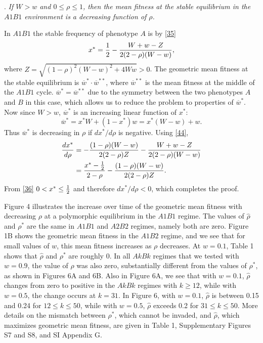 \documentclass[9pt,twocolumn,twoside,lineno]{pnas-new}
\newcommand{\an}[1]{\begin{align}#1\end{align}}
\begin{document}
. {\sl If $W>w$ and $0\le\rho\le 1$, then the mean fitness at the stable equilibrium in the $A1B1$ environment is a decreasing function of $\rho$.}\par
\medskip

 In $A1B1$ the stable frequency of phenotype $A$ is by \eqref{35}
\begin{equation}
x^* ={1\over 2} -{W+w-Z\over 2(2-\rho)(W-w)},
\label{44}\end{equation}
where $Z =\sqrt{(1-\rho)^2(W-w)^2 +4Ww}>0$.
The geometric mean fitness at the stable equilibrium is $\overline w^*\cdot \overline w^{**}$, where $\overline w^{**}$ is the mean fitness at the middle of the $A1B1$ cycle.
$\overline w^* =\overline w^{**}$ due to the symmetry between the two phenotypes $A$ and $B$ in this case, which allows us to reduce the problem to properties of $\overline w^*$.  Now since $W>w$,  $\overline w^*$ is an increasing linear function of $x^*$:
\begin{equation}
\overline w^* =x^*W +(1-x^*)w = x^*(W-w) +w.
\label{45}\end{equation}
Thus $\overline w^*$ is decreasing in $\rho$ if $dx^*/d\rho$ is negative. Using \eqref{44},
\begin{equation}
\an{
{dx^*\over d\rho} &=- {(1-\rho)(W-w)\over 2(2-\rho)Z} -{W+w-Z\over 2(2-\rho)(W-w)}\\
& = {x^*-{1\over 2}\over 2-\rho} -{(1-\rho)(W-w)\over 2(2-\rho)Z}.}
\label{46}\end{equation}
From \eqref{36} $0<x^*\le{1\over 2}$ and therefore $dx^*/d\rho <0$, which completes the proof.

Figure 4 illustrates the increase over time of the geometric mean fitness with decreasing $\rho$ at a polymorphic equilibrium in the $A1B1$ regime.
The values of $\hat\rho$ and $\rho^*$ are the same in $A1B1$ and $A2B2$ regimes, namely both are zero.
Figure 1B shows the geometric mean fitness in the $A1B2$ regime, and we see that for small values of $w$, this mean fitness increases as $\rho$ decreases.
At $w=0.1$, Table 1 shows that $\hat\rho$ and $\rho^*$ are roughly 0.
In all $AkBk$ regimes that we tested with $w=0.9$, the value of $\hat\rho$ was also zero, substantially different from the values of $\rho^*$, as shown in Figures 6A and 6B.
Also in Figure 6A, we see that with $w=0.1$, $\hat\rho$ changes from zero to positive in the $AkBk$ regimes with $k \ge 12$, while with $w=0.5$, the change occurs at $k=31$.
In Figure 6, with $w=0.1$, $\hat\rho$ is between 0.15 and 0.24 for $12\le k\le 50$, while with $w=0.5$, $\hat\rho$ exceeds 0.2 for $31\le k\le 50$.
More details on the mismatch between $\rho^*$, which cannot be invaded, and $\hat\rho$, which maximizes geometric mean fitness, are given in Table 1, Supplementary Figures S7 and S8, and SI Appendix G.
\end{document}
